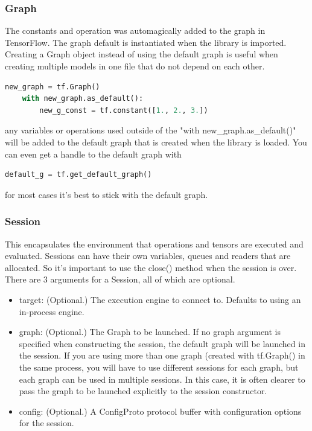 \subsubsection{Graph}

The constants and operation was automagically added to the graph in TensorFlow. The graph default is instantiated when the library is imported. Creating a Graph object instead of using the default graph is useful when creating multiple models in one file that do not depend on each other.

\begin{lstlisting}[language=Python]
    new_graph = tf.Graph()
    with new_graph.as_default():
        new_g_const = tf.constant([1., 2., 3.])
\end{lstlisting}

any variables or operations used outside of the "with new\_graph.as\_default()" will be added to the default graph that is created when the library is loaded. You can even get a handle to the default graph with

\begin{lstlisting}[language=Python]
    default_g = tf.get_default_graph()
\end{lstlisting}

for most cases it’s best to stick with the default graph.

\subsubsection{Session}

This encapsulates the environment that operations and tensors are executed and evaluated. Sessions can have their own variables, queues and readers that are allocated. So it’s important to use the close() method when the session is over. There are 3 arguments for a Session, all of which are optional.

\begin{itemize}
    \item target: (Optional.) The execution engine to connect to. Defaults to using an in-process engine. 
    \item graph: (Optional.) The Graph to be launched. If no graph argument is specified when constructing the session, the default graph will be launched in the session. If you are using more than one graph (created with tf.Graph() in the same process, you will have to use different sessions for each graph, but each graph can be used in multiple sessions. In this case, it is often clearer to pass the graph to be launched explicitly to the session constructor.
    \item config: (Optional.) A ConfigProto protocol buffer with configuration options for the session.
\end{itemize}

